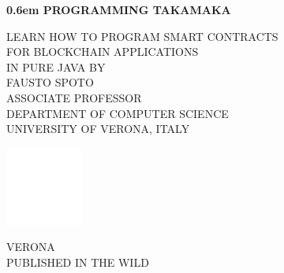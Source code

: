\BgThispage
\newcommand\nbvspace[1][3]{\vspace*{\stretch{#1}}}
\newcommand\nbstretchyspace{\spaceskip0.5em plus 0.25em minus 0.25em}
\newcommand{\nbtitlestretch}{\spaceskip0.6em}
\pagestyle{empty}
\begin{center}
\bfseries
\nbvspace[1]
\Huge
{\nbtitlestretch\huge
PROGRAMMING TAKAMAKA}

\nbvspace[1]
\normalsize

LEARN HOW TO PROGRAM SMART CONTRACTS\\
FOR BLOCKCHAIN APPLICATIONS\\
IN PURE JAVA
\nbvspace[1]
\small BY\\
\Large FAUSTO SPOTO\\[0.5em]
\footnotesize ASSOCIATE PROFESSOR\\
DEPARTMENT OF COMPUTER SCIENCE\\
UNIVERSITY OF VERONA, ITALY

\nbvspace[2]

\includegraphics[width=1in]{./pics/logo_minimal.png}
\nbvspace[3]
\normalsize

VERONA\\
\large
PUBLISHED IN THE WILD
\nbvspace[1]
\end{center}

